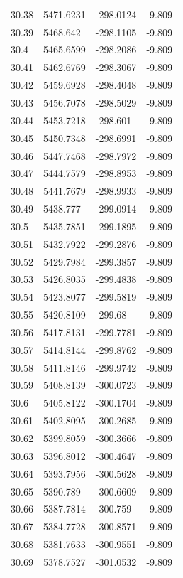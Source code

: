 \begin{table}[H]
\begin{tabular}{llll}
30.38 & 5471.6231 & -298.0124 & -9.809 \\
30.39 & 5468.642 & -298.1105 & -9.809 \\
30.4 & 5465.6599 & -298.2086 & -9.809 \\
30.41 & 5462.6769 & -298.3067 & -9.809 \\
30.42 & 5459.6928 & -298.4048 & -9.809 \\
30.43 & 5456.7078 & -298.5029 & -9.809 \\
30.44 & 5453.7218 & -298.601 & -9.809 \\
30.45 & 5450.7348 & -298.6991 & -9.809 \\
30.46 & 5447.7468 & -298.7972 & -9.809 \\
30.47 & 5444.7579 & -298.8953 & -9.809 \\
30.48 & 5441.7679 & -298.9933 & -9.809 \\
30.49 & 5438.777 & -299.0914 & -9.809 \\
30.5 & 5435.7851 & -299.1895 & -9.809 \\
30.51 & 5432.7922 & -299.2876 & -9.809 \\
30.52 & 5429.7984 & -299.3857 & -9.809 \\
30.53 & 5426.8035 & -299.4838 & -9.809 \\
30.54 & 5423.8077 & -299.5819 & -9.809 \\
30.55 & 5420.8109 & -299.68 & -9.809 \\
30.56 & 5417.8131 & -299.7781 & -9.809 \\
30.57 & 5414.8144 & -299.8762 & -9.809 \\
30.58 & 5411.8146 & -299.9742 & -9.809 \\
30.59 & 5408.8139 & -300.0723 & -9.809 \\
30.6 & 5405.8122 & -300.1704 & -9.809 \\
30.61 & 5402.8095 & -300.2685 & -9.809 \\
30.62 & 5399.8059 & -300.3666 & -9.809 \\
30.63 & 5396.8012 & -300.4647 & -9.809 \\
30.64 & 5393.7956 & -300.5628 & -9.809 \\
30.65 & 5390.789 & -300.6609 & -9.809 \\
30.66 & 5387.7814 & -300.759 & -9.809 \\
30.67 & 5384.7728 & -300.8571 & -9.809 \\
30.68 & 5381.7633 & -300.9551 & -9.809 \\
30.69 & 5378.7527 & -301.0532 & -9.809 \\

\end{tabular}
\end{table}
